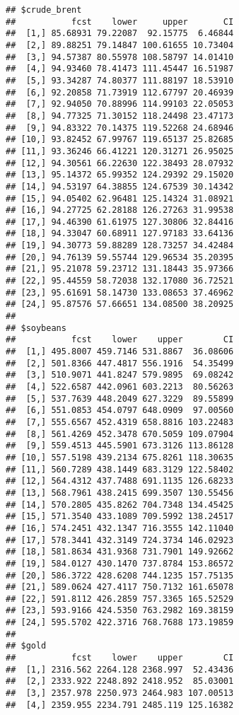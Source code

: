 \documentclass[
]{article}
\begin{document}
\begin{verbatim}
## $crude_brent
##           fcst    lower     upper       CI
##  [1,] 85.68931 79.22087  92.15775  6.46844
##  [2,] 89.88251 79.14847 100.61655 10.73404
##  [3,] 94.57387 80.55978 108.58797 14.01410
##  [4,] 94.93460 78.41473 111.45447 16.51987
##  [5,] 93.34287 74.80377 111.88197 18.53910
##  [6,] 92.20858 71.73919 112.67797 20.46939
##  [7,] 92.94050 70.88996 114.99103 22.05053
##  [8,] 94.77325 71.30152 118.24498 23.47173
##  [9,] 94.83322 70.14375 119.52268 24.68946
## [10,] 93.82452 67.99767 119.65137 25.82685
## [11,] 93.36246 66.41221 120.31271 26.95025
## [12,] 94.30561 66.22630 122.38493 28.07932
## [13,] 95.14372 65.99352 124.29392 29.15020
## [14,] 94.53197 64.38855 124.67539 30.14342
## [15,] 94.05402 62.96481 125.14324 31.08921
## [16,] 94.27725 62.28188 126.27263 31.99538
## [17,] 94.46390 61.61975 127.30806 32.84416
## [18,] 94.33047 60.68911 127.97183 33.64136
## [19,] 94.30773 59.88289 128.73257 34.42484
## [20,] 94.76139 59.55744 129.96534 35.20395
## [21,] 95.21078 59.23712 131.18443 35.97366
## [22,] 95.44559 58.72038 132.17080 36.72521
## [23,] 95.61691 58.14730 133.08653 37.46962
## [24,] 95.87576 57.66651 134.08500 38.20925
## 
## $soybeans
##           fcst    lower    upper        CI
##  [1,] 495.8007 459.7146 531.8867  36.08606
##  [2,] 501.8366 447.4817 556.1916  54.35499
##  [3,] 510.9071 441.8247 579.9895  69.08242
##  [4,] 522.6587 442.0961 603.2213  80.56263
##  [5,] 537.7639 448.2049 627.3229  89.55899
##  [6,] 551.0853 454.0797 648.0909  97.00560
##  [7,] 555.6567 452.4319 658.8816 103.22483
##  [8,] 561.4269 452.3478 670.5059 109.07904
##  [9,] 559.4513 445.5901 673.3126 113.86128
## [10,] 557.5198 439.2134 675.8261 118.30635
## [11,] 560.7289 438.1449 683.3129 122.58402
## [12,] 564.4312 437.7488 691.1135 126.68233
## [13,] 568.7961 438.2415 699.3507 130.55456
## [14,] 570.2805 435.8262 704.7348 134.45425
## [15,] 571.3540 433.1089 709.5992 138.24517
## [16,] 574.2451 432.1347 716.3555 142.11040
## [17,] 578.3441 432.3149 724.3734 146.02923
## [18,] 581.8634 431.9368 731.7901 149.92662
## [19,] 584.0127 430.1470 737.8784 153.86572
## [20,] 586.3722 428.6208 744.1235 157.75135
## [21,] 589.0624 427.4117 750.7132 161.65078
## [22,] 591.8112 426.2859 757.3365 165.52529
## [23,] 593.9166 424.5350 763.2982 169.38159
## [24,] 595.5702 422.3716 768.7688 173.19859
## 
## $gold
##           fcst    lower    upper        CI
##  [1,] 2316.562 2264.128 2368.997  52.43436
##  [2,] 2333.922 2248.892 2418.952  85.03001
##  [3,] 2357.978 2250.973 2464.983 107.00513
##  [4,] 2359.955 2234.791 2485.119 125.16382

\end{verbatim}
\end{document}
